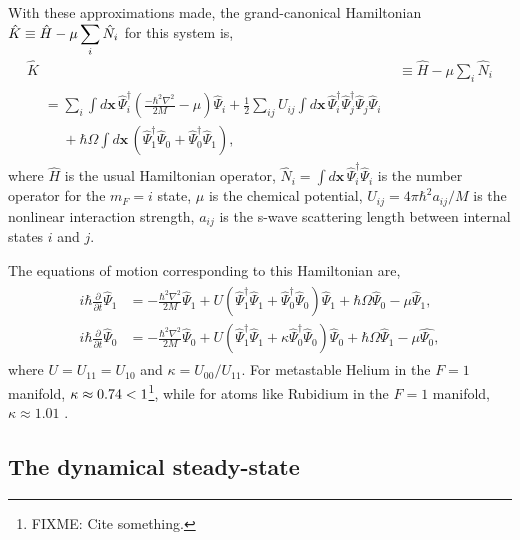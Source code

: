 With these approximations made, the grand-canonical Hamiltonian $\displaystyle\protect{\hat{K} \equiv \hat{H} - \mu \sum_i \hat{N}_i}$ for this system is,
\begin{align}
    \hat{K} &\equiv \hat{H} - \mu \sum_i \hat{N}_i\\
    \begin{split}
            &= \sum_i \int d\mathbf{x}\, \hat{\Psi}_i^\dagger \left(\frac{-\hbar^2 \nabla^2}{2 M} - \mu\right)\hat{\Psi}_i + \frac{1}{2} \sum_{i j} U_{i j}\int d\mathbf{x}\, \hat{\Psi}_i^\dagger \hat{\Psi}_j^\dagger \hat{\Psi}_j \hat{\Psi}_i\\
            &\phantom{=} + \hbar \Omega \int d\mathbf{x}\, \left(\hat{\Psi}_1^\dagger \hat{\Psi}_0 + \hat{\Psi}_0^\dagger \hat{\Psi}_1\right),
    \end{split}
\end{align}
where $\hat{H}$ is the usual Hamiltonian operator, $\displaystyle\hat{N}_i= \int d\mathbf{x}\, \hat{\Psi}_i^\dagger \hat{\Psi}_i$ is the number operator for the $m_F=i$ state, $\mu$ is the chemical potential, $U_{ij} = 4\pi \hbar^2 a_{ij}/M$ is the nonlinear interaction strength, $a_{ij}$ is the s-wave scattering length between internal states $i$ and $j$. 

The equations of motion corresponding to this Hamiltonian are,
\begin{align}
    \begin{split}
    i \hbar \frac{\partial}{\partial t} \hat{\Psi}_1 &= -\frac{\hbar^2 \nabla^2}{2M} \hat{\Psi}_1 + U \left(\hat{\Psi}_1^\dagger \hat{\Psi}_1 + \hat{\Psi}_0^\dagger \hat{\Psi}_0\right) \hat{\Psi}_1 + \hbar \Omega \hat{\Psi}_0 - \mu \hat{\Psi}_1,  \\
    i \hbar \frac{\partial}{\partial t} \hat{\Psi}_0 &= -\frac{\hbar^2 \nabla^2}{2M} \hat{\Psi}_0 + U \left(\hat{\Psi}_1^\dagger \hat{\Psi}_1 + \kappa \hat{\Psi}_0^\dagger \hat{\Psi}_0 \right) \hat{\Psi}_0 + \hbar \Omega \hat{\Psi}_1 - \mu \hat{\Psi_0},
    \label{Peaks:OperatorEquationsOfMotion}
    \end{split}
\end{align}
where $U=U_{11}=U_{10}$ and $\kappa = U_{00}/U_{11}$. For metastable Helium in the $F=1$ manifold, $\protect{\kappa \approx 0.74 < 1}$\footnote{FIXME: Cite something.}, while for atoms like Rubidium in the $F=1$ manifold, $\kappa \approx 1.01$ \cite{Ho:1998}. 

\subsection{The dynamical steady-state}

